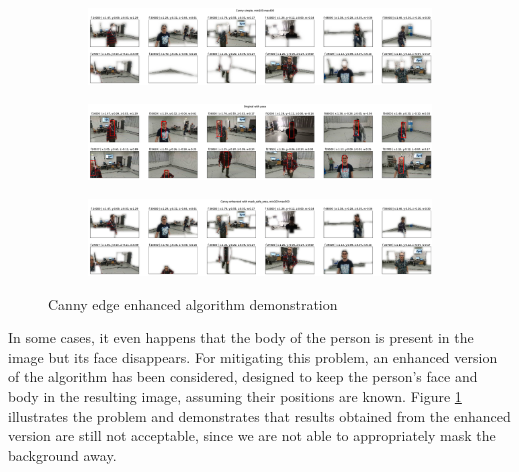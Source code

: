 \begin{figure}[!h]
	\begin{center}
		\begin{subfigure}[h]{1\textwidth}
			\centering
			\includegraphics[width=1\textwidth]{"contents/images/04-1canny-enhance-1"}
		\end{subfigure}
		\vfill
		\begin{subfigure}[h]{1\textwidth}
			\centering
			\includegraphics[width=1\textwidth]{"contents/images/04-1canny-enhance-2"}
		\end{subfigure}
		\vfill
		\begin{subfigure}[h]{1\textwidth}
			\centering
			\includegraphics[width=1\textwidth]{"contents/images/04-1canny-enhance-3"}
		\end{subfigure}
	\end{center}
	\vspace{-0.5cm}
	\caption[Canny edge enhanced algorithm demonstration]{Canny edge enhanced algorithm demonstration}
	\label{fig:canny-enanhced}
\end{figure}

In some cases, it even happens that the body of the person is present in the image but its face disappears. For mitigating this problem, an enhanced version of the algorithm has been considered, designed to keep the person's face and body in the resulting image, assuming their positions are known. Figure \ref{fig:canny-enanhced} illustrates the problem and demonstrates that results obtained from the enhanced version are still not acceptable, since we are not able to appropriately mask the background away.



